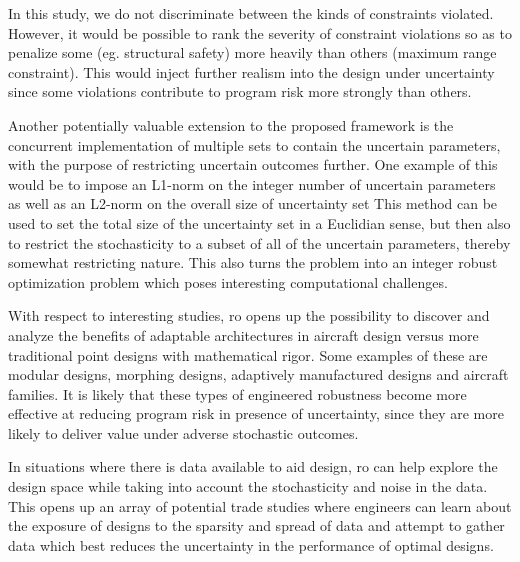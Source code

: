 In this study, we do not discriminate between the kinds of constraints violated. However, it would
be possible to rank the severity of constraint violations so as to penalize some (eg. structural safety)
more heavily than others (maximum range constraint). This would inject further realism into the
design under uncertainty since some violations contribute to program risk more
strongly than others.

Another potentially valuable extension to the proposed framework is the concurrent implementation
of multiple sets to contain the uncertain parameters, with the purpose of restricting uncertain
outcomes further. One example of this would be to impose an  L1-norm on the integer number of uncertain parameters
as well as an L2-norm on the overall size of uncertainty set
This method can be used to set the total size of the uncertainty set in a Euclidian sense,
but then also to restrict the stochasticity to a subset of all of the uncertain parameters,
thereby somewhat restricting nature. This also turns the problem into an integer robust
optimization problem which poses interesting computational challenges.

With respect to interesting studies, \gls{ro} opens up the possibility to discover and analyze the benefits
of adaptable architectures in aircraft design versus more traditional point designs
with mathematical rigor. Some examples of these are modular designs, morphing designs,
adaptively manufactured designs and aircraft families. It is likely that these types of engineered
robustness become more effective at reducing program risk
in presence of uncertainty, since they are more likely
to deliver value under adverse stochastic outcomes.

In situations where there is data available to aid design, \gls{ro} can help explore
the design space while taking into account the stochasticity and noise in the data.
This opens up an array of potential trade studies where engineers can learn about
the exposure of designs to the sparsity and spread of data and attempt to gather
data which best reduces the uncertainty in the performance of optimal designs.
